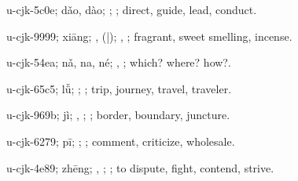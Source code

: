 \begin{multicols}{2}
{\cjkgGlue{}u-cjk-5c0e; dǎo, dào; \cjkgGlue{}\cjkgGlue{}\cjkgGlue{}; \cjkgGlue{}; direct, guide, lead, conduct.

\cjkgGlue{}u-cjk-9999; xiāng; \cjkgGlue{}, \cjkgGlue{}\cjkgGlue{}(\cjkgGlue{}|\cjkgGlue{}); \cjkgGlue{}, \cjkgGlue{}; fragrant, sweet smelling, incense.

\cjkgGlue{}u-cjk-54ea; nǎ, na, né; \cjkgGlue{}, \cjkgGlue{}; which? where? how?.

\cjkgGlue{}u-cjk-65c5; lǚ; \cjkgGlue{}; \cjkgGlue{}; trip, journey, travel, traveler.

\cjkgGlue{}u-cjk-969b; jì; \cjkgGlue{}, \cjkgGlue{}; \cjkgGlue{}; border, boundary, juncture.

\cjkgGlue{}u-cjk-6279; pī; \cjkgGlue{}; \cjkgGlue{}; comment, criticize, wholesale.

\cjkgGlue{}u-cjk-4e89; zhēng; \cjkgGlue{}\cjkgGlue{}\cjkgGlue{}, \cjkgGlue{}\cjkgGlue{}\cjkgGlue{}; \cjkgGlue{}; to dispute, fight, contend, strive.

}
\end{multicols}
